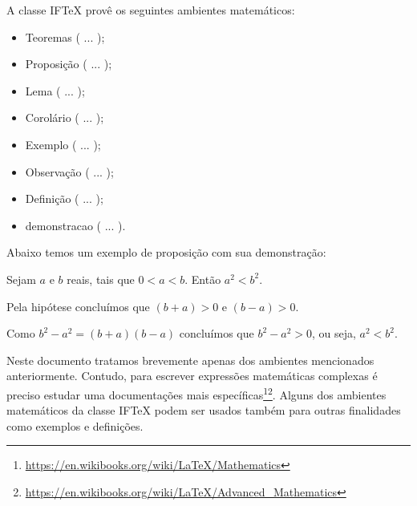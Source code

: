 A classe {IF\TeX} provê os seguintes ambientes matemáticos:
\begin{itemize}
 \item Teoremas ( ... );
 \item Proposição ( ... );
 \item Lema ( ... );
 \item Corolário ( ... );
 \item Exemplo ( ... );
 \item Observação ( ... );
 \item Definição ( ... );
 \item demonstracao ( ... ).
\end{itemize}

Abaixo temos um exemplo de proposição com sua demonstração:
\begin{proposicao}
 Sejam $a$ e $b$ reais, tais que $0<a<b$. Então $a^2<b^2$.
\end{proposicao}
\begin{demonstracao}
 Pela hipótese concluímos que $(b+a)>0$ e $(b-a)>0$.

Como $b^2-a^2=(b+a)(b-a)$ concluímos que $b^2-a^2>0$, ou seja, $a^2<b^2$.
\end{demonstracao}

Neste documento tratamos brevemente apenas dos ambientes mencionados anteriormente. Contudo, para escrever expressões matemáticas complexas é preciso estudar uma documentações mais específicas\footnote{\url{https://en.wikibooks.org/wiki/LaTeX/Mathematics}}\footnote{\url{https://en.wikibooks.org/wiki/LaTeX/Advanced_Mathematics}}.
Alguns dos ambientes matemáticos da classe {IF\TeX} podem ser usados também para outras finalidades como exemplos e definições.
